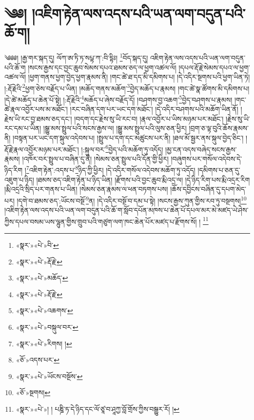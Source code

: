 \chapter{༄༅། །འཇིག་རྟེན་ལས་འདས་པའི་ཡན་ལག་བདུན་པའི་ཆོ་ག།}༄༅༅། །རྒྱ་གར་སྐད་དུ། ལོཀ་ཨ་ཏི་ཏ་སཔྟ་ཀ་:བི་དྷིཿ། \footnote{«སྣར་»«པེ་»བི་}བོད་སྐད་དུ། འཇིག་རྟེན་ལས་འདས་པའི་ཡན་ལག་བདུན་པའི་ཆོ་ག །སངས་རྒྱས་དང་བྱང་ཆུབ་སེམས་དཔའ་ཐམས་ཅད་ལ་ཕྱག་འཚལ་ལོ། །དཔལ་རྡོ་རྗེ་སེམས་དཔའ་ལ་ཕྱག་འཚལ་ལོ། །ཕྱག་གནས་ཕྱག་བྱེད་ཕྱག་རྣམས་ནི། །གང་ཚེ་ཐ་དད་མི་དམིགས་པ། །དེ་འདིར་སྔགས་པའི་ཕྱག་ཡིན་ཏེ། །:རྡོ་རྗེའི་\footnote{«སྣར་»«པེ་»རྡོ་རྗེ་}ཕྱག་ཅེས་བརྗོད་པ་ཡིན། །མཆོད་གནས་མཆོག་\footnote{«སྣར་»«པེ་»མཆོད་}བྱེད་མཆོད་པ་རྣམས། །གང་ཚེ་སྣ་ཚོགས་མི་དམིགས་པ། །དེ་ཚེ་མཆོད་པ་ཆེན་པོ་སྟེ། །:རྡོ་རྗེའི་\footnote{«སྣར་»«པེ་»རྡོ་རྗེ་}མཆོད་པ་ཞེས་བརྗོད་དོ། །བཤགས་བྱ་འཆག་\footnote{«སྣར་»«པེ་»འཆགས་}བྱེད་བཤགས་པ་རྣམས། །གང་ཚེ་རྣལ་འབྱོར་པས་མ་མཐོང་། །རང་བཞིན་དག་པར་ཡང་དག་མཐོང་། །དེ་འདིར་བཤགས་པའི་མཆོག་ཡིན་ནོ། །རྗེས་ཡི་རང་བྱ་ཐམས་ཅད་དང་། །བདག་དང་རྗེས་སུ་ཡི་རང་བ། །རྣལ་འབྱོར་པ་ཡིས་མཉམ་པར་མཐོང་། །རྗེས་སུ་ཡི་རང་དམ་པ་ཡིན། །སྒྱུ་མས་སྤྲུལ་པའི་སངས་རྒྱས་ལ། །སྒྱུ་མས་སྤྲུལ་པའི་ལུས་ཅན་ཕྱིར། །བྲག་ཅ་ལྟ་བུའི་ཆོས་རྣམས་ནི། །བསྟན་པར་ཡང་དག་སྐུལ་འདེབས་པ། །སྤྲུལ་པ་དག་དང་མཚུངས་པར་ནི། །ཐལ་མོ་སྦྱར་ནས་སྐུལ་བྱེད་ཅིང་། །རྡོ་རྗེ་རྣལ་འབྱོར་མཉམ་པར་མཐོང་། །:སྐུལ་བར་\footnote{«སྣར་»«པེ་»བསྐུལ་བར་}བྱེད་པའི་མཆོག་ཏུ་འདོད། །མྱ་ངན་འདས་བཞེད་སངས་རྒྱས་རྣམས། །འཁོར་བར་སྤྲུལ་པ་བཞིན་དུ་ནི། །སེམས་ཅན་སྤྲུལ་པའི་དོན་གྱི་ཕྱིར། །བཞུགས་པར་གསོལ་འདེབས་དེ་ཉིད་རིག །\footnote{«སྣར་»«པེ་»རིགས། །}འཇིག་རྟེན་:འདས་པ་\footnote{«ཅོ་»འདས་པར་}ཉིད་ཀྱི་ཕྱིར། །དེ་འདིར་གསོལ་འདེབས་མཆོག་ཏུ་འདོད། །དམིགས་པ་ཅན་དུ་འཇུག་པ་ཉིད། །ཐམས་ཅད་འཇིག་རྟེན་པ་ཉིད་ཡིན། །རྫོགས་པའི་བྱང་ཆུབ་རྨི་འདྲ་ལ། །དེ་ཉིད་རིག་པས་རྨི་འདྲར་རིག །རྨི་འདྲའི་སྲིད་པར་གནས་པ་ཡིན། །སེམས་ཅན་རྣམས་ལ་ཕན་བཏགས་པས། །ཆོས་དབྱིངས་བཞིན་དུ་དཔག་མེད་པར། །དགེ་བ་ཐམས་ཅད་:ཡོངས་བསྔོ་\footnote{«སྣར་»«པེ་»ཡོངས་བསྔོས་}ན། །དེ་འདིར་བསྔོ་བ་དམ་པ་སྟེ། །སངས་རྒྱས་ཀུན་གྱིས་རབ་ཏུ་བསྔགས།\footnote{«ཅོ་»སྔགས།} །འཇིག་རྟེན་ལས་འདས་པའི་ཡན་ལག་བདུན་པའི་ཆོ་ག་སློབ་དཔོན་མཁས་པ་ཆེན་པོ་དཔལ་མར་མེ་མཛད་ཡེ་ཤེས་ཀྱིས་དཔལ་བསམ་ཡས་ལྷུན་གྱིས་གྲུབ་པའི་གཙུག་ལག་ཁང་ཆེན་པོར་མཛད་པ་རྫོགས་སོ། ། \footnote{«སྣར་»«པེ་»། ། པཎྜི་ཏ་དེ་ཉིད་དང་ལོ་ཙཱ་བ་ཤཱཀྱ་བློ་གྲོས་ཀྱིས་བསྒྱུར་རོ། །}